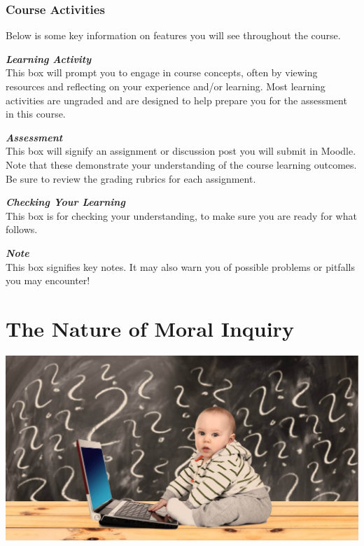 \documentclass[
]{book}
\begin{document}
\hypertarget{course-activities}{%
\subsection*{Course Activities}\label{course-activities}}

Below is some key information on features you will see throughout the course.~

\begin{reflect}
\textbf{\emph{Learning Activity}}\\
This box will prompt you to engage in course concepts, often by viewing
resources and reflecting on your experience and/or learning. Most
learning activities are ungraded and are designed to help prepare you
for the assessment in this course.
\end{reflect}

\begin{assessment}
\textbf{\emph{Assessment}}\\
This box will signify an assignment or discussion post you will submit
in Moodle. Note that these demonstrate your understanding of the course
learning outcomes. Be sure to review the grading rubrics for each
assignment.
\end{assessment}

\begin{progress}
\textbf{\emph{Checking Your Learning}}\\
This box is for checking your understanding, to make sure you are ready
for what follows.
\end{progress}

\begin{caution}
\textbf{\emph{Note}}\\
This box signifies key notes. It may also warn you of possible problems
or pitfalls you may encounter!
\end{caution}

\hypertarget{the-nature-of-moral-inquiry}{%
\chapter{The Nature of Moral Inquiry}\label{the-nature-of-moral-inquiry}}

\includegraphics{assets/unit_1/U1_baby-2709666_1920.jpg}
\end{document}
